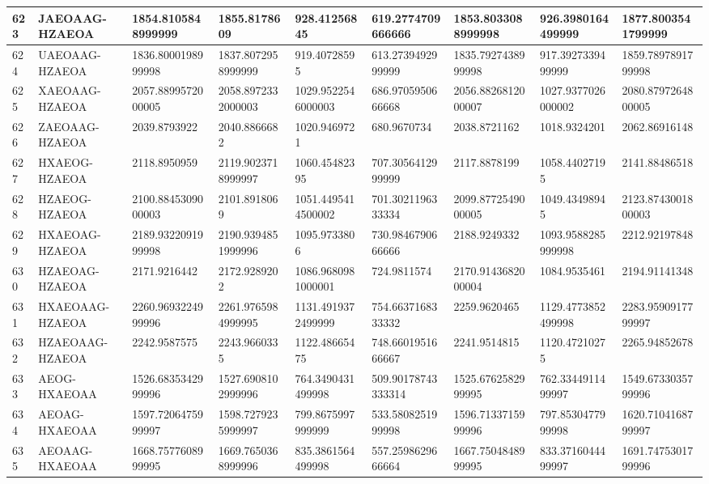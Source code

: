 {\begin{longtable}{|l|l|l|l|l|l|l|l|l|}
        623 & JAEOAAG-HZAEOA & 1854.8105848999999 & 1855.8178609 & 928.41256845 & 619.2774709666666 & 1853.8033088999998 & 926.3980164499999 & 1877.8003541799999 \\ \hline
        624 & UAEOAAG-HZAEOA & 1836.8000198999998 & 1837.8072958999999 & 919.40728595 & 613.2739492999999 & 1835.7927438999998 & 917.3927339499999 & 1859.7897891799998 \\ \hline
        625 & XAEOAAG-HZAEOA & 2057.8899572000005 & 2058.8972332000003 & 1029.9522546000003 & 686.9705950666668 & 2056.8826812000007 & 1027.9377026000002 & 2080.8797264800005 \\ \hline
        626 & ZAEOAAG-HZAEOA & 2039.8793922 & 2040.8866682 & 1020.9469721 & 680.9670734 & 2038.8721162 & 1018.9324201 & 2062.86916148 \\ \hline
        627 & HXAEOG-HZAEOA & 2118.8950959 & 2119.9023718999997 & 1060.45482395 & 707.3056412999999 & 2117.8878199 & 1058.44027195 & 2141.88486518 \\ \hline
        628 & HZAEOG-HZAEOA & 2100.8845309000003 & 2101.8918069 & 1051.4495414500002 & 701.3021196333334 & 2099.8772549000005 & 1049.43498945 & 2123.8743001800003 \\ \hline
        629 & HXAEOAG-HZAEOA & 2189.9322091999998 & 2190.9394851999996 & 1095.9733806 & 730.9846790666666 & 2188.9249332 & 1093.9588285999998 & 2212.92197848 \\ \hline
        630 & HZAEOAG-HZAEOA & 2171.9216442 & 2172.9289202 & 1086.9680981000001 & 724.9811574 & 2170.9143682000004 & 1084.9535461 & 2194.91141348 \\ \hline
        631 & HXAEOAAG-HZAEOA & 2260.9693224999996 & 2261.9765984999995 & 1131.4919372499999 & 754.6637168333332 & 2259.9620465 & 1129.4773852499998 & 2283.9590917799997 \\ \hline
        632 & HZAEOAAG-HZAEOA & 2242.9587575 & 2243.9660335 & 1122.48665475 & 748.6601951666667 & 2241.9514815 & 1120.47210275 & 2265.94852678 \\ \hline
        633 & AEOG-HXAEOAA & 1526.6835342999996 & 1527.6908102999996 & 764.3490431499998 & 509.90178743333314 & 1525.6762582999995 & 762.3344911499997 & 1549.6733035799996 \\ \hline
        634 & AEOAG-HXAEOAA & 1597.7206475999997 & 1598.7279235999997 & 799.8675997999999 & 533.5808251999998 & 1596.7133715999996 & 797.8530477999998 & 1620.7104168799997 \\ \hline
        635 & AEOAAG-HXAEOAA & 1668.7577608999995 & 1669.7650368999996 & 835.3861564499998 & 557.2598629666664 & 1667.7504848999995 & 833.3716044499997 & 1691.7475301799996 \\ \hline

\end{longtable}}
